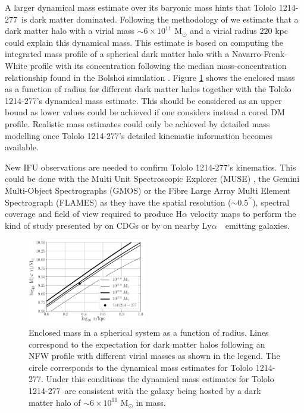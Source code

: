 \documentclass[a4paper,fleqn,usenatbib]{mnras}
\newcommand{\tol}{Tololo 1214-277}
\newcommand{\lya}{\ifmmode{{\rm Ly}\alpha}\else Ly$\alpha$\ \fi}
\begin{document}
A larger dynamical mass estimate over its baryonic mass hints that
\tol\ is dark matter dominated.  
Following the methodology of \citet{2011ApJ...726..108T} we estimate
that a dark matter halo with a virial mass $\sim 6\times 10^{11}$
M$_{\odot}$ and a virial radius $220$ kpc could explain this dynamical mass.
This estimate is based on computing the integrated mass profile of a
spherical dark matter halo with a Navarro-Frenk-White profile with its
concentration following the median mass-concentration
relationship found in the Bolshoi simulation
\citep{2012MNRAS.423.3018P,2016ApJ...832..169P}.  
Figure \ref{fig:mass} shows the enclosed mass as a function of radius
for different dark matter halos together with the \tol's dynamical
mass estimate. 
This should be considered as an upper bound as lower values
  could be achieved if one considers instead a cored DM profile.
Realistic mass estimates could only be achieved by detailed mass
  modelling once \tol's detailed kinematic information becomes
  available.

New IFU observations are needed to confirm \tol's kinematics.
This could be done with the Multi Unit Spectroscopic Explorer (MUSE) 
\citep{2014Msngr.157...13B}, the Gemini Multi-Object Spectrographs (GMOS) 
\citep{2004PASP..116..425H} or the Fibre Large Array Multi Element
Spectrograph (FLAMES) \citep{2002Msngr.110....1P} as they have the spatial
resolution ($\sim0.5^{\prime\prime}$), spectral coverage and field
of view required to produce H$\alpha$ velocity maps to perform the
kind of study presented by \citet{2015A&A...577A..21C} on CDGs or by
\citet{Herenz16} on nearby \lya\ emitting galaxies.



\begin{figure}
\begin{center}
\includegraphics[width=0.46\textwidth]{enclosed_mass.pdf}
\caption{Enclosed mass in a spherical system as a function of radius.
  Lines correspond to the expectation for dark matter halos following
  an NFW profile with
  different virial masses as shown in the legend. The circle corresponds
  to the dynamical mass estimates for \tol.  
  Under this conditions the dynamical mass estimates for \tol\ are consistent with the
  galaxy being hosted by a dark matter halo of
  $\sim 6\times10^{11}$ M$_{\odot}$ in mass.
    \label{fig:mass}} 
\end{center}
\end{figure}
\end{document}
